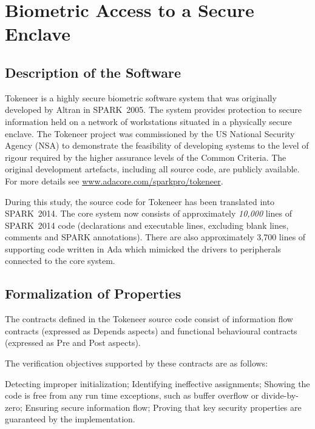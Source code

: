 \documentclass[10pt,a4paper,twocolumn]{article}
\newcommand{\oldspark}{SPARK~2005\xspace}
\newcommand{\newspark}{SPARK~2014\xspace}
\begin{document}
\section{Biometric Access to a Secure Enclave}


\subsection{Description of the Software}

Tokeneer is a highly secure biometric software system that was
originally developed by Altran in \oldspark. The system provides
protection to secure information held on a network of workstations
situated in a physically secure enclave. The Tokeneer project was
commissioned by the US National Security Agency (NSA) to demonstrate
the feasibility of developing systems to the level of rigour required
by the higher assurance levels of the Common Criteria. The original
development artefacts, including all source code, are publicly
available. For more details see
\url{www.adacore.com/sparkpro/tokeneer}.

During this study, the source code for Tokeneer has been translated
into \newspark. The core system now consists of approximately
\emph{10,000} lines of \newspark code (declarations and executable
lines, excluding blank lines, comments and SPARK annotations). There
are also approximately 3,700 lines of supporting code written in Ada
which mimicked the drivers to peripherals connected to the core
system.


\subsection{Formalization of Properties}

The contracts defined in the Tokeneer source code consist of
information flow contracts (expressed as Depends aspects) and
functional behavioural contracts (expressed as Pre and Post aspects).

The verification objectives supported by these contracts are as follows:

Detecting improper initialization; Identifying ineffective
assignments; Showing the code is free from any run time exceptions,
such as buffer overflow or divide-by-zero; Ensuring secure information
flow; Proving that key security properties are guaranteed by the
implementation.

\end{document}
